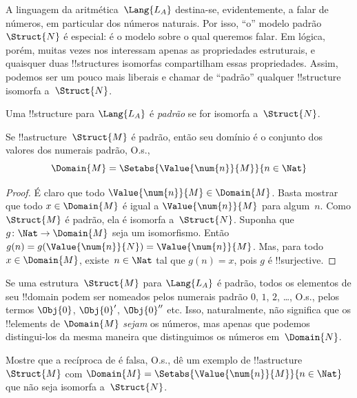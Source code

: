 \documentclass[../../../include/open-logic-section]{subfiles}
\begin{document}

A linguagem da aritmética~$\Lang{L_A}$ destina-se, evidentemente, a
falar de números, em particular dos números naturais. Por isso, ``o''
modelo padrão~$\Struct{N}$ é especial: é o modelo sobre o qual queremos
falar. Em lógica, porém, muitas vezes nos interessam apenas as
propriedades estruturais, e quaisquer duas !!{structure}s isomorfas
compartilham essas propriedades. Assim, podemos ser um pouco mais
liberais e chamar de ``padrão'' qualquer !!{structure} isomorfa
a~$\Struct{N}$.

\begin{defn}
Uma !!{structure} para $\Lang{L_A}$ é \emph{padrão} se for isomorfa
a~$\Struct{N}$.
\end{defn}

\begin{prop}
 Se !!a{structure}~$\Struct{M}$ é padrão,
então seu domínio é o conjunto dos valores dos numerais padrão, O.s.\@,
\[
\Domain{M} = \Setabs{\Value{\num{n}}{M}}{n \in \Nat}
\]
\end{prop}

\begin{proof}
É claro que todo $\Value{\num{n}}{M} \in \Domain{M}$. Basta mostrar
que todo $x \in \Domain{M}$ é igual a $\Value{\num{n}}{M}$ para
algum~$n$. Como $\Struct{M}$ é padrão, ela é isomorfa
a~$\Struct{N}$. Suponha que $g\colon \Nat \to \Domain{M}$ seja um
isomorfismo. Então $g(n) = g(\Value{\num{n}}{N}) =
\Value{\num{n}}{M}$. Mas, para todo $x \in \Domain{M}$, existe~$n
\in \Nat$ tal que $g(n) = x$, pois $g$ é !!{surjective}.
\end{proof}

\begin{explain}
Se uma estrutura~$\Struct{M}$ para $\Lang{L_A}$ é padrão, todos os
elementos de seu !!{domain} podem ser nomeados pelos numerais padrão
$\num{0}$, $\num{1}$, $\num{2}$, \dots, O.s.\@, pelos termos $\Obj{0}$,
$\Obj{0}'$, $\Obj{0}''$ etc. Isso, naturalmente, não significa que os
!!{element}s de $\Domain{M}$ \emph{sejam} os números, mas apenas que
podemos distingui-los da mesma maneira que distinguimos os números
em~$\Domain{N}$.
\end{explain}

\begin{prob}
Mostre que a recíproca de 
é falsa, O.s.\@, dê um exemplo de !!a{structure}~$\Struct{M}$ com
$\Domain{M} = \Setabs{\Value{\num{n}}{M}}{n \in \Nat}$ que não seja
isomorfa a~$\Struct{N}$.
\end{prob}
\end{document}
